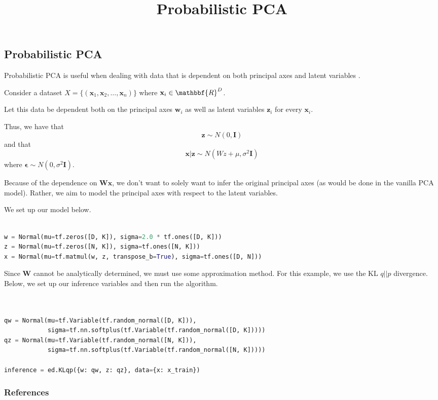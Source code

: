\title{Probabilistic PCA}

\subsection{Probabilistic PCA}

Probabilistic PCA is useful when dealing with data that is dependent on both principal axes and latent variables \citep{Tipping99probabilisticprincipal}.

Consider a dataset $X = \{(\mathbf{x}_1, \mathbf{x}_2,\ldots , \mathbf{x}_n)\}$ where $\mathbf{x}_i \in \mathbbf{R}^D$.

Let this data be dependent both on the principal axes $\mathbf{w}_i$ as well as latent variables $\mathbf{z}_i$ for every $\mathbf{x}_i$.

Thus, we have that $$\mathbf{z} \sim N(0, \mathbf{I})$$ and that $$\mathbf{x} \vert \mathbf{z} \sim N(Wz + \mu, \sigma^2\mathbf{I})$$ where $\mathbf{\epsilon} \sim N(0, \sigma^2\mathbf{I})$.

Because of the dependence on $\mathbf{Wx}$, we don't want to solely want to infer the original principal axes (as would be done in the vanilla PCA model). Rather, we aim to model the principal axes with respect to the latent variables.

We set up our model below.

\begin{lstlisting}[language=Python]

w = Normal(mu=tf.zeros([D, K]), sigma=2.0 * tf.ones([D, K]))
z = Normal(mu=tf.zeros([N, K]), sigma=tf.ones([N, K]))
x = Normal(mu=tf.matmul(w, z, transpose_b=True), sigma=tf.ones([D, N]))

\end{lstlisting}

Since $\mathbf{W}$ cannot be analytically determined, we must use some approximation method. For this example, we use the KL $q\vert\vert p$ divergence. Below, we set up our inference variables and then run the algorithm.

\begin{lstlisting}[language=Python]


qw = Normal(mu=tf.Variable(tf.random_normal([D, K])),
            sigma=tf.nn.softplus(tf.Variable(tf.random_normal([D, K]))))
qz = Normal(mu=tf.Variable(tf.random_normal([N, K])),
            sigma=tf.nn.softplus(tf.Variable(tf.random_normal([N, K]))))

inference = ed.KLqp({w: qw, z: qz}, data={x: x_train})
\end{lstlisting}

\subsubsection{References}\label{references}
